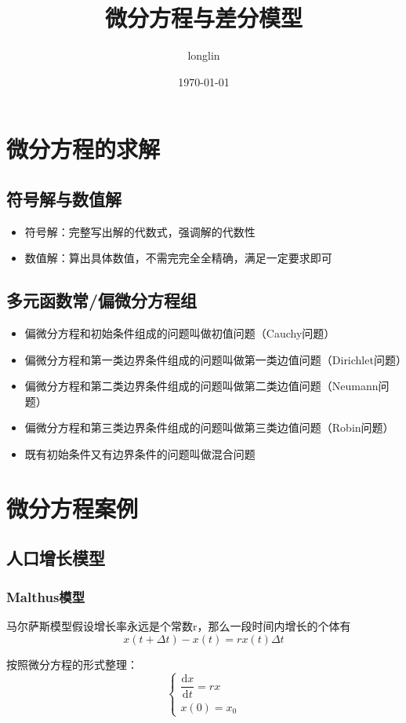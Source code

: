\documentclass[12pt,a4paper]{article}
\title{微分方程与差分模型}
\author{longlin}
\date{\today}
\begin{document}
\maketitle

\section{微分方程的求解}
\subsection{符号解与数值解}
\begin{itemize}
    \item 符号解：完整写出解的代数式，强调解的代数性
    \item 数值解：算出具体数值，不需完完全全精确，满足一定要求即可
\end{itemize}

\subsection{多元函数常/偏微分方程组}
\begin{itemize}
    \item 偏微分方程和初始条件组成的问题叫做初值问题（Cauchy问题）
    \item 偏微分方程和第一类边界条件组成的问题叫做第一类边值问题（Dirichlet问题）
    \item 偏微分方程和第二类边界条件组成的问题叫做第二类边值问题（Neumann问题）
    \item 偏微分方程和第三类边界条件组成的问题叫做第三类边值问题（Robin问题）
    \item 既有初始条件又有边界条件的问题叫做混合问题
\end{itemize}

\section{微分方程案例}
\subsection{人口增长模型}
\subsubsection{Malthus模型}
马尔萨斯模型假设增长率永远是个常数r，那么一段时间内增长的个体有
$$
x(t + \Delta t) - x(t) = rx(t)\Delta t
$$

按照微分方程的形式整理：
$$
\begin{cases}
    \dfrac{\textrm{d} x}{\textrm{d} t} = rx \\
    x(0) = x_0
\end{cases}
$$
\end{document}
